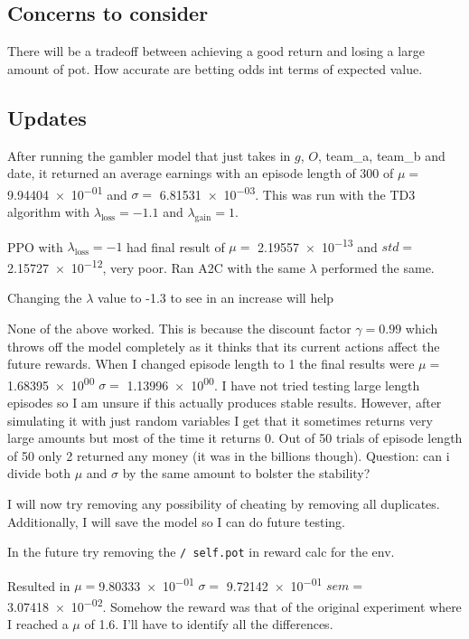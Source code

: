 \documentclass{article}
\begin{document}
    \subsection*{Concerns to consider}
        There will be a tradeoff between achieving a good return and losing a large amount of pot.
        How accurate are betting odds int terms of expected value.


    \subsection*{Updates}
        After running the gambler model that just takes in $g$, $O$, team\_a, team\_b and date, it returned an average earnings with an episode length of 300 of $\mu =$ \num{9.94404e-01} and $\sigma =$ \num{6.81531e-03}.
        This was run with the TD3 algorithm with $\lambda_{\text{loss}} = -1.1$ and $\lambda_{\text{gain}} = 1$.

        PPO with $\lambda_{\text{loss}} = -1$ had final result of $\mu=$ \num{2.19557e-13} and
        $std=$ \num{2.15727e-12}, very poor.
        Ran A2C with the same $\lambda$ performed the same.

        Changing the $\lambda$ value to -1.3 to see in an increase will help

        None of the above worked. This is because the discount factor $\gamma = 0.99$ which throws off the model
        completely as it thinks that its current actions affect the future rewards. When I changed episode length
        to 1 the final results were $\mu=$ \num{1.68395e+00} $\sigma=$ \num{1.13996e+00}. I have not tried
        testing large length episodes so I am unsure if this actually produces stable results. However,
        after simulating it with just random variables I get that it sometimes returns very large amounts but most
        of the time it returns 0. Out of 50 trials of episode length of 50 only 2 returned any money (it was in the 
        billions though). Question: can i divide both $\mu$ and $\sigma$ by the same amount to bolster the stability?

        I will now try removing any possibility of cheating by removing all duplicates. Additionally, I will save 
        the model so I can do future testing. 

        In the future try removing the \verb|/ self.pot| in reward calc for the env.

        Resulted in $\mu=$\num{9.80333e-01} $\sigma =$ \num{9.72142e-01} $sem=$ \num{3.07418e-02}. Somehow the reward
        was that of the original experiment where I reached a $\mu$ of 1.6. I'll have to identify all the differences.
\end{document}
